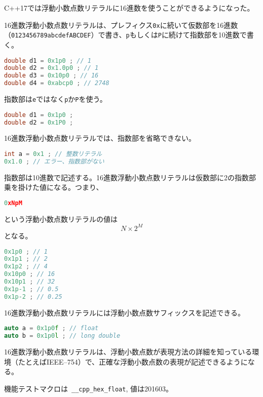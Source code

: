 %

C++17では浮動小数点数リテラルに16進数を使うことができるようになった。

16進数浮動小数点数リテラルは、プレフィクス\lstinline!0x!に続いて仮数部を16進数（\lstinline!0123456789abcdefABCDEF!）で書き、\lstinline!p!もしくは\lstinline!P!に続けて指数部を10進数で書く。

\begin{lstlisting}[language=C++]
double d1 = 0x1p0 ; // 1
double d2 = 0x1.0p0 ; // 1
double d3 = 0x10p0 ; // 16
double d4 = 0xabcp0 ; // 2748
\end{lstlisting}

指数部は\lstinline!e!ではなく\lstinline!p!か\lstinline!P!を使う。

\begin{lstlisting}[language=C++]
double d1 = 0x1p0 ;
double d2 = 0x1P0 ;
\end{lstlisting}

16進数浮動小数点数リテラルでは、指数部を省略できない。

\begin{lstlisting}[language=C++]
int a = 0x1 ; // 整数リテラル
0x1.0 ; // エラー、指数部がない
\end{lstlisting}

指数部は10進数で記述する。16進数浮動小数点数リテラルは仮数部に2の指数部乗を掛けた値になる。つまり、
\begin{lstlisting}[language=C++]
0xNpM
\end{lstlisting}
という浮動小数点数リテラルの値は
\[
    N \times 2^M
\]
となる。

\begin{lstlisting}[language=C++]
0x1p0 ; // 1
0x1p1 ; // 2
0x1p2 ; // 4
0x10p0 ; // 16
0x10p1 ; // 32
0x1p-1 ; // 0.5
0x1p-2 ; // 0.25
\end{lstlisting}

16進数浮動小数点数リテラルには浮動小数点数サフィックスを記述できる。

\begin{lstlisting}[language=C++]
auto a = 0x1p0f ; // float
auto b = 0x1p0l ; // long double
\end{lstlisting}

16進数浮動小数点数リテラルは、浮動小数点数が表現方法の詳細を知っている環境（たとえばIEEE--754）で、正確な浮動小数点数の表現が記述できるようになる。

機能テストマクロは~\lstinline!__cpp_hex_float!, 値は201603。
